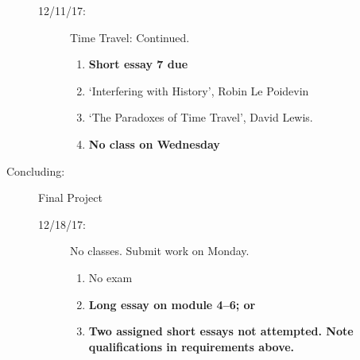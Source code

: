 \documentclass[article,oneside]{memoir}
\begin{document}
\begin{description}
\begin{description}
\begin{enumerate}
\end{enumerate}
\item[12/11/17:] Time Travel: Continued.
\begin{enumerate}
\item \textbf{Short essay 7 due}
\item `Interfering with History', Robin Le Poidevin 
\item `The Paradoxes of Time Travel', David Lewis.
\item \textbf{No class on Wednesday}

\end{enumerate}
\end{description}

\item[Concluding:] Final Project
\begin{description}
\item[12/18/17:] No classes. Submit work on Monday.
\begin{enumerate}
\item No exam
\item \textbf{Long essay on module 4--6; or} 
\item \textbf{Two assigned short essays not attempted. Note qualifications in requirements above.}

\end{enumerate}
\end{description}
\end{description} 



\end{document}
